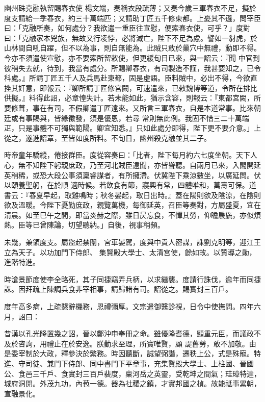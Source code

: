 \begin{pinyinscope}
 幽州硃克融執留賜春衣使
 楊文端，奏稱衣段疏薄；又奏今歲三軍春衣不足，擬於度支請給一季春衣，約三十萬端匹；又請助丁匠五千修東都。上憂其不遜，問宰臣曰：「克融所奏，如何處分？我欲遣一重臣往宣慰，便索春衣使，可乎？」度對曰：「克融家本兇族，無故又行凌悖，必將滅亡，陛下不足為慮。譬如一豺虎，於山林間自吼自躍，但不以為事，則自無能為。此賊只敢於巢穴中無禮，動即不得。今亦不須遣使宣慰，亦不要索所留敕使，但更緩旬日已來，與一詔云：『聞
 中官到彼稍失去就，待到，我當有處分。所賜卿春衣，有司製造不謹，我甚要知之，已令科處。』所請丁匠五千人及兵馬赴東都，固是虛語。臣料賊中，必出不得，今欲直挫其奸意，即報云：『卿所請丁匠修宮闕，可速遣來，已敕魏博等道，令所在排比供擬。』料得此詔，必章惶失計。若未能如此，猶示含容，則報云：『東都宮闕，所要修葺，事在有司，不假卿遣丁匠遠來。又所言三軍春衣，自是本道常事。比來朝廷或有事賜與，皆緣徵發，須是優恩，若尋
 常則無此例。我固不惜三二十萬端疋，只是事體不可獨與範陽。卿宜知悉。』只如此處分即得，陛下更不要介意。」上從之，遂進詔章，至皆如度所料。不旬日，幽州殺克融並其二子。



 時帝童年驕縱，倦接群臣。度從容奏曰：「比者，陛下每月約六七度坐朝。天下人心，無不知陛下躬親庶政，乃至河北賊臣遠聞，亦皆聳聽。自兩月已來，入閣開延英稍稀，或恐大段公事須稟睿謀者，有所擁滯。伏冀陛下乘涼數坐，以廣延問。伏以頤養聖躬，在於順
 適時候。若飲食有節，寢興有常，四體唯和，萬壽可保。道書云：『春夏早起，取雞鳴時；秋冬晏起，取日出時。』蓋在陽則欲及陰涼，在陰則欲及溫暖。今陛下憂勤庶政，親覽萬機，每御延英，召臣等奏對，方屬盛夏，宜在清晨。如至巳午之間，即當炎赫之際，雖日昃忘食，不憚其勞，仰瞻扆旒，亦似煩熱。臣等已曾陳論，切望聽納。」自後，視事稍頻。



 未幾，兼領度支。屬盜起禁闈，宮車晏駕，度與中貴人密謀，誅劉克明等，迎江王立為天子。以功加門下侍郎、
 集賢殿大學士、太清宮使，餘如故。以贊導之勛，進階特進。



 時滄景節度使李全略死，其子同捷竊弄兵柄，以求繼襲。度請行誅伐，逾年而同捷誅。因拜疏上陳調兵食非宰相事，請歸諸有司。詔從之。賜實封三百戶。



 度年高多病，上疏懇辭機務，恩禮彌厚。文宗遣御醫診視，日令中使撫問。四年六月，詔曰：



 昔漢以孔光降置幾之詔，晉以鄭沖申奉冊之命。雖優隆耆德，顯重元臣，而議政不及於咨詢，用禮止在於安逸。朕勤求至理，所寶唯賢，顧
 諟舊勞，敢不加敬。由是委宰制於大政，釋參決於繁務。時因聽斷，誠望弼諧，遷秩上公，式是殊寵。特進、守司徒、兼門下侍郎、同中書門下平章事，充集賢殿大學士、上柱國、晉國公、食邑三千戶、食實封三百戶裴度，稟河岳之英靈，受乾坤之間氣；珪璋特達，城府洞開。外茂九功，內苞一德。器為社稷之鎮，才實邦國之楨。故能祗事累朝，宣融景化。




\end{pinyinscope}
